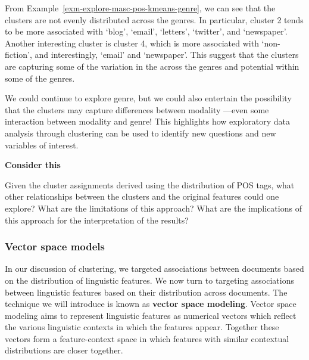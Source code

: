 \documentclass[
  letterpaper,
  krantz1]{latex/krantz-mod}
\theoremstyle{definition}
\theoremstyle{definition}
\theoremstyle{remark}
\begin{document}
From Example~\ref{exm-explore-masc-pos-kmeans-genre}, we can see that
the clusters are not evenly distributed across the genres. In
particular, cluster 2 tends to be more associated with `blog', `email',
`letters', `twitter', and `newspaper'. Another interesting cluster is
cluster 4, which is more associated with `non-fiction', and
interestingly, `email' and `newspaper'. This suggest that the clusters
are capturing some of the variation in the across the genres and
potential within some of the genres.

We could continue to explore genre, but we could also entertain the
possibility that the clusters may capture differences between modality
---even some interaction between modality and genre! This highlights how
exploratory data analysis through clustering can be used to identify new
questions and new variables of interest.

\begin{tcolorbox}[enhanced jigsaw, toprule=.15mm, breakable, colback=white, arc=.35mm, left=2mm, colframe=quarto-callout-color-frame, opacityback=0, bottomrule=.15mm, rightrule=.15mm, leftrule=.75mm]

\textbf{ Consider this}

Given the cluster assignments derived using the distribution of POS
tags, what other relationships between the clusters and the original
features could one explore? What are the limitations of this approach?
What are the implications of this approach for the interpretation of the
results?

\end{tcolorbox}

\subsubsection{Vector space
models}\label{sec-explore-vector-space-models}

In our discussion of clustering, we targeted associations between
documents based on the distribution of linguistic features. We now turn
to targeting associations between linguistic features based on their
distribution across documents. The technique we will introduce is known
as \textbf{vector space modeling}.
Vector space modeling aims to represent linguistic features as numerical
vectors which reflect the various linguistic contexts in which the
features appear. Together these vectors form a feature-context space in
which features with similar contextual distributions are closer
together.
\end{document}
